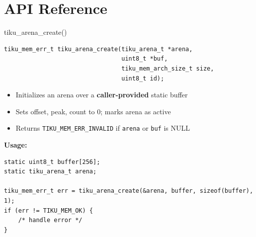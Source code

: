 \documentclass[aspectratio=169, 10pt]{beamer}
\begin{document}
\section{API Reference}

\begin{frame}[fragile]{tiku\_arena\_create()}
\begin{lstlisting}[style=cstyle]
tiku_mem_err_t tiku_arena_create(tiku_arena_t *arena,
                                 uint8_t *buf,
                                 tiku_mem_arch_size_t size,
                                 uint8_t id);
\end{lstlisting}

\begin{itemize}
  \item Initializes an arena over a \textbf{caller-provided} static buffer
  \item Sets offset, peak, count to 0; marks arena as active
  \item Returns \texttt{TIKU\_MEM\_ERR\_INVALID} if \texttt{arena} or \texttt{buf} is NULL
\end{itemize}

\vspace{0.3em}
\textbf{Usage:}
\begin{lstlisting}[style=cstyle]
static uint8_t buffer[256];
static tiku_arena_t arena;

tiku_mem_err_t err = tiku_arena_create(&arena, buffer, sizeof(buffer), 1);
if (err != TIKU_MEM_OK) {
    /* handle error */
}
\end{lstlisting}
\end{frame}
\end{document}
